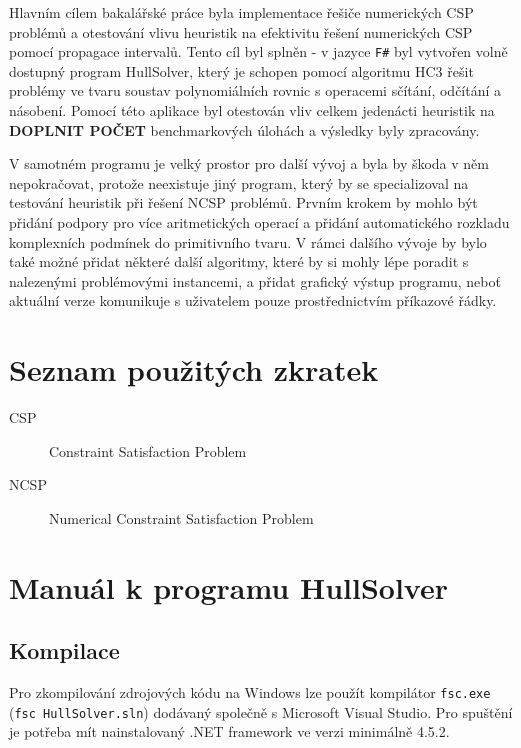 \documentclass[thesis=B,czech]{FITthesis}[2012/06/26]
\theoremstyle{definition}
\begin{document}
\begin{conclusion}
Hlavním cílem bakalářské práce byla implementace řešiče numerických CSP problémů a otestování vlivu heuristik na efektivitu řešení numerických CSP pomocí propagace intervalů. Tento cíl byl splněn - v jazyce \texttt{F\#} byl vytvořen volně dostupný program HullSolver, který je schopen pomocí algoritmu HC3 řešit problémy ve tvaru soustav polynomiálních rovnic s operacemi sčítání, odčítání a násobení. Pomocí této aplikace byl otestován vliv celkem jedenácti heuristik na \textbf{DOPLNIT POČET} benchmarkových úlohách a výsledky byly zpracovány.

V samotném programu je velký prostor pro další vývoj a byla by škoda v něm nepokračovat, protože neexistuje jiný program, který by se specializoval na testování heuristik při řešení NCSP problémů. Prvním krokem by mohlo být přidání podpory pro více aritmetických operací a přidání automatického rozkladu komplexních podmínek do primitivního tvaru. V rámci dalšího vývoje by bylo také možné přidat některé další algoritmy, které by si mohly lépe poradit s nalezenými problémovými instancemi, a přidat grafický výstup programu, neboť aktuální verze komunikuje s uživatelem pouze prostřednictvím příkazové řádky.




\end{conclusion}




\appendix

\chapter{Seznam použitých zkratek}
\begin{description}
	\item[CSP] Constraint Satisfaction Problem
	\item[NCSP] Numerical Constraint Satisfaction Problem
\end{description}



\chapter{Manuál k programu HullSolver}
\label{hullSolverManual}
\section{Kompilace}
Pro zkompilování zdrojových kódu na Windows lze použít kompilátor \verb|fsc.exe| (\verb|fsc HullSolver.sln|) dodávaný společně s Microsoft Visual Studio. Pro spuštění je potřeba mít nainstalovaný .NET framework ve verzi minimálně 4.5.2.
\end{document}
